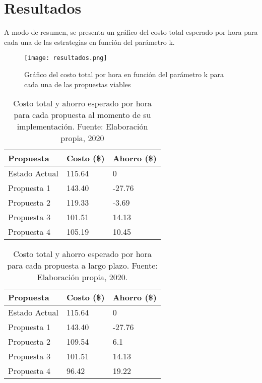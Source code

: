 \documentclass{article}
\begin{document}
\section{Resultados}
A modo de resumen, se presenta un gráfico del costo total esperado por hora
para cada una de las estrategias en función del parámetro k. \\
\begin{figure}[h]
\begin{center}
	\texttt{[image: resultados.png]}
		 \caption{Gráfico del costo total por hora en función del parámetro k para cada una de las propuestas viables}
\label{fig4:resultados}
\end{center}
\end{figure}

\begin{table}[h]
\centering
\begin{tabular}{  | m{5.5cm} | m{3cm} | m{3cm} | }
 \hline
	Propuesta & Costo (\$) & Ahorro (\$) \\ [0.5ex] 
 \hline\hline
	Estado Actual & 115.64 & 0 \\ 
 \hline
	Propuesta 1 & 143.40 & -27.76 \\ 
 \hline
	Propuesta 2 & 119.33 & -3.69 \\ 
 \hline
	Propuesta 3 & 101.51 & 14.13 \\ 
 \hline
	Propuesta 4 & 105.19 & 10.45 \\ [1ex]
 \hline
\end{tabular}
	\caption{Costo total y ahorro esperado por hora para cada propuesta al
	momento de su implementación. Fuente: Elaboración propia, 2020}
\end{table}

\begin{table}[h]
\centering
\begin{tabular}{  | m{5.5cm} | m{3cm} | m{3cm} | }
 \hline
	Propuesta & Costo (\$) & Ahorro (\$) \\ [0.5ex] 
 \hline\hline
	Estado Actual & 115.64 & 0 \\ 
 \hline
	Propuesta 1 & 143.40 & -27.76 \\ 
 \hline
	Propuesta 2 & 109.54 & 6.1 \\ 
 \hline
	Propuesta 3 & 101.51 & 14.13 \\ 
 \hline
	Propuesta 4 & 96.42 & 19.22 \\ [1ex]
 \hline
\end{tabular}
	\caption{Costo total y ahorro esperado por hora para cada propuesta a largo plazo.
	Fuente: Elaboración propia, 2020.}
\end{table}
\clearpage
\end{document}
